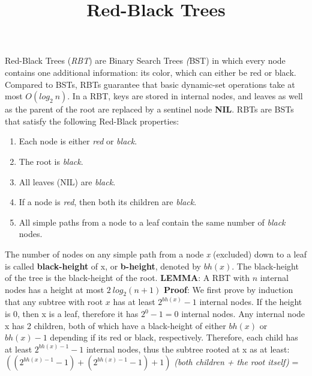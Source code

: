 \documentclass[12pt]{article}
\title{\vspace{-1.0cm} Red-Black Trees}
\date{}
\begin{document}
    \maketitle
    \vspace{-2.0cm}
Red-Black Trees (\textit{RBT}) are Binary Search Trees \textit({BST}) in which every node contains one additional information: its color,
which can either be red or black.
Compared to BSTs, RBTs guarantee that basic dynamic-set operations take at most $O(log_2 \ n)$.
In a RBT, keys are stored in internal nodes, and leaves as well as the parent of the root are replaced
by a sentinel node \textbf{NIL}.
RBTs are BSTs that satisfy the following Red-Black properties:
\begin{enumerate}
    \item Each node is either \textit{red} or \textit{black}.
    \item The root is \textit{black}.
    \item All leaves (NIL) are \textit{black}.
    \item If a node is \textit{red}, then both its children are \textit{black}.
    \item All simple paths from a node to a leaf contain the same number of \textit{black} nodes.
\end{enumerate}
The number of nodes on any simple path from a node \textit{x} (excluded) down to a leaf is called
\textbf{black-height} of x, or \textbf{b-height}, denoted by $bh(x)$. \newline
The black-height of the tree is the black-height of the root. \newline \newline
\textbf{LEMMA}: A RBT with $n$ internal nodes has a height at most $2 \ log_2(n + 1)$ \newline \newline
    \textbf{Proof}: \newline
We first prove by induction that any subtree with root $x$ has at least $2^{bh(x)} - 1$ internal nodes.
If the height is 0, then x is a leaf, therefore it has $2^0 - 1 = 0$ internal nodes. \newline
Any internal node x has 2 children, both of which have a black-height of either $bh(x)$ or $bh(x) - 1$
depending if its red or black, respectively. \newline
Therefore, each child has at least $2^{bh(x) - 1} - 1$ internal nodes, thus the subtree rooted at x
as at least: \newline
    $((2^{bh(x) - 1} - 1) + (2^{bh(x) - 1} - 1) + 1)$ \textit{(both children + the root itself)} = \newline \newline
\end{document}
